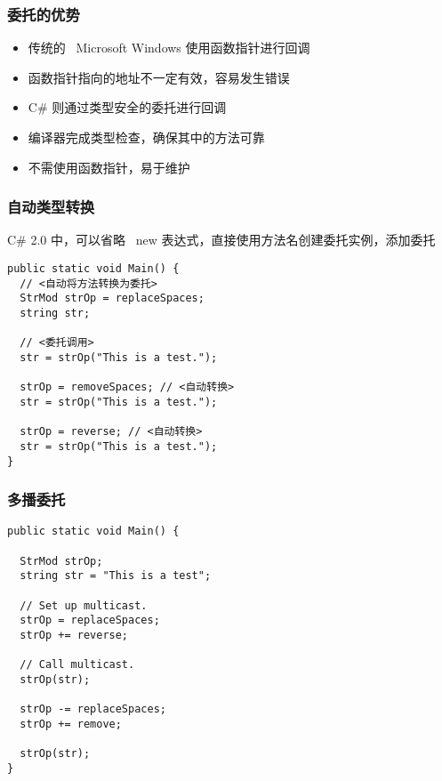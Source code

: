 \begin{frame}
\frametitle{委托的优势}

\begin{itemize}
\setlength{\itemsep}{6pt plus 1pt}
\item 传统的 ~Microsoft Windows 使用函数指针进行回调
\item 函数指针指向的地址不一定有效，容易发生错误
\item C\# 则通过类型安全的委托进行回调
\item 编译器完成类型检查，确保其中的方法可靠
\item 不需使用函数指针，易于维护
\end{itemize}

\end{frame}

\begin{frame}[fragile]
\frametitle{自动类型转换}
\CJKindent C\# 2.0 中，可以省略 ~new 表达式，直接使用方法名创建委托实例，添加委托
\begin{lstlisting}[escapeinside=<>]
public static void Main() {
  // <自动将方法转换为委托>
  StrMod strOp = replaceSpaces;
  string str;

  // <委托调用>
  str = strOp("This is a test.");

  strOp = removeSpaces; // <自动转换>
  str = strOp("This is a test.");

  strOp = reverse; // <自动转换>
  str = strOp("This is a test.");
}
\end{lstlisting}
\end{frame}


\begin{frame}[fragile]
\frametitle{多播委托}
\begin{lstlisting}
public static void Main() {

  StrMod strOp;
  string str = "This is a test";

  // Set up multicast.
  strOp = replaceSpaces;
  strOp += reverse;

  // Call multicast.
  strOp(str);

  strOp -= replaceSpaces;
  strOp += remove;

  strOp(str);
}
\end{lstlisting}
\end{frame}

